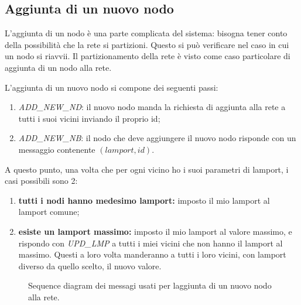 \documentclass{memoir}
\begin{document}
\subsection{Aggiunta di un nuovo nodo}
L'aggiunta di un nodo è una parte complicata del sistema: bisogna tener conto della
	   possibilità che la rete si partizioni. Questo si può verificare nel caso in cui
	   un nodo si riavvii. Il partizionamento della rete è visto come caso particolare
	   di aggiunta di un nodo alla rete.

L'aggiunta di un nuovo nodo si compone dei seguenti passi:
\begin{enumerate}
	\item \textit{ADD\_NEW\_ND}: il nuovo nodo manda la richiesta di aggiunta alla rete
	   a tutti i suoi vicini inviando il proprio id;
	\item \textit{ADD\_NEW\_NB}: il nodo che deve aggiungere il nuovo nodo risponde
	   con un messaggio contenente $(lamport,id)$.
\end{enumerate}
A questo punto, una volta che per ogni vicino ho i suoi parametri di lamport, i casi
	   possibili sono 2:
\begin{enumerate}
	\item \textbf{tutti i nodi hanno medesimo lamport:} imposto il mio lamport al lamport
	   comune;
	\item \textbf{esiste un lamport massimo:} imposto il mio lamport al valore massimo,
	   e rispondo con \textit{UPD\_LMP} a tutti i miei vicini che non hanno il lamport al
	   massimo. Questi a loro volta manderanno a tutti i loro vicini, con lamport diverso
	   da quello scelto, il nuovo valore.
\end{enumerate}

\begin{figure}[h]
\caption{Sequence diagram dei messagi usati per laggiunta di un nuovo nodo alla rete.}
\label{img:newnode}
\end{figure}
\end{document}
